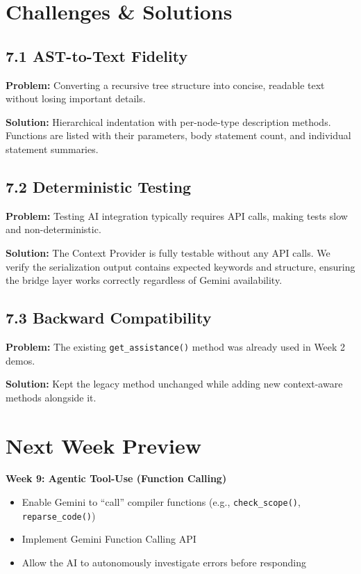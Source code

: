 \documentclass[a4paper,11pt]{article}
\begin{document}
    \section{Challenges \& Solutions}

    \subsection{7.1 AST-to-Text Fidelity}
    \textbf{Problem:} Converting a recursive tree structure into concise, readable text without losing important details.

    \textbf{Solution:} Hierarchical indentation with per-node-type description methods. Functions are listed with their parameters, body statement count, and individual statement summaries.

    \subsection{7.2 Deterministic Testing}
    \textbf{Problem:} Testing AI integration typically requires API calls, making tests slow and non-deterministic.

    \textbf{Solution:} The Context Provider is fully testable without any API calls. We verify the serialization output contains expected keywords and structure, ensuring the bridge layer works correctly regardless of Gemini availability.

    \subsection{7.3 Backward Compatibility}
    \textbf{Problem:} The existing \texttt{get\_assistance()} method was already used in Week 2 demos.

    \textbf{Solution:} Kept the legacy method unchanged while adding new context-aware methods alongside it.

    \section{Next Week Preview}

    \textbf{Week 9: Agentic Tool-Use (Function Calling)}

    \begin{itemize}[leftmargin=*]
        \item Enable Gemini to ``call'' compiler functions (e.g., \texttt{check\_scope()}, \texttt{reparse\_code()})
        \item Implement Gemini Function Calling API
        \item Allow the AI to autonomously investigate errors before responding
    \end{itemize}
\end{document}
